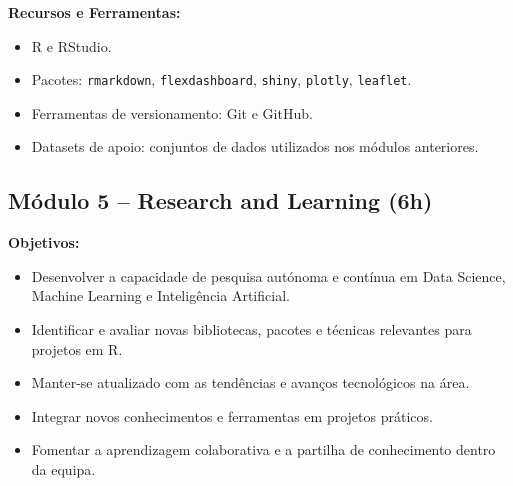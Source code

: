 \documentclass[12pt]{article}
\begin{document}
\textbf{Recursos e Ferramentas:}
\begin{itemize}
  \item R e RStudio.
  \item Pacotes: \texttt{rmarkdown}, \texttt{flexdashboard}, \texttt{shiny}, \texttt{plotly}, \texttt{leaflet}.
  \item Ferramentas de versionamento: Git e GitHub.
  \item Datasets de apoio: conjuntos de dados utilizados nos módulos anteriores.
\end{itemize}



%


\subsection*{Módulo 5 – Research and Learning (6h)}

\textbf{Objetivos:}
\begin{itemize}
  \item Desenvolver a capacidade de pesquisa autónoma e contínua em Data Science, Machine Learning e Inteligência Artificial.
  \item Identificar e avaliar novas bibliotecas, pacotes e técnicas relevantes para projetos em R.
  \item Manter-se atualizado com as tendências e avanços tecnológicos na área.
  \item Integrar novos conhecimentos e ferramentas em projetos práticos.
  \item Fomentar a aprendizagem colaborativa e a partilha de conhecimento dentro da equipa.
\end{itemize}
\end{document}
